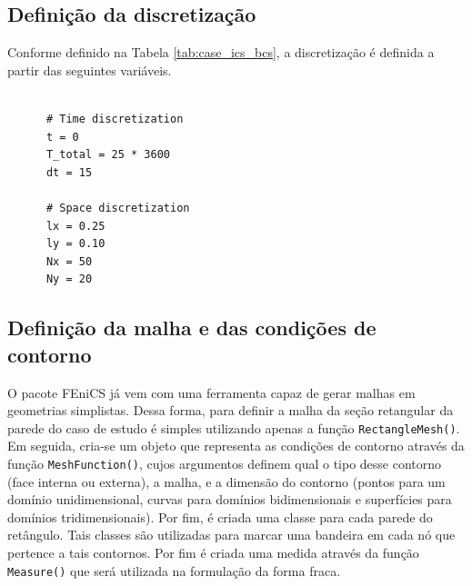     \subsection{Definição da discretização}
    Conforme definido na Tabela \ref{tab:case_ics_bcs}, a discretização é
    definida a partir das seguintes variáveis.
    
    \begin{verbatim}
      
      # Time discretization
      t = 0
      T_total = 25 * 3600
      dt = 15
      
      # Space discretization
      lx = 0.25
      ly = 0.10
      Nx = 50
      Ny = 20
    \end{verbatim} 

    \subsection{Definição da malha e das condições de contorno}
    O pacote FEniCS já vem com uma ferramenta capaz de gerar malhas em
    geometrias simplistas. Dessa forma, para definir a malha da seção retangular
    da parede do caso de estudo é simples utilizando apenas a função
    \texttt{RectangleMesh()}. Em seguida, cria-se um
    objeto que representa as condições de contorno através da função
    \texttt{MeshFunction()}, cujos argumentos definem
    qual o tipo desse contorno (face interna ou externa), a malha, e a dimensão
    do contorno (pontos para um domínio unidimensional, curvas para domínios
    bidimensionais e superfícies para domínios tridimensionais). Por fim, é
    criada uma classe para cada parede do retângulo. Tais classes são utilizadas
    para marcar uma bandeira em cada nó que pertence a tais contornos. Por fim é
    criada uma medida através da função \texttt{Measure()} que será utilizada na formulação da forma fraca.
    
